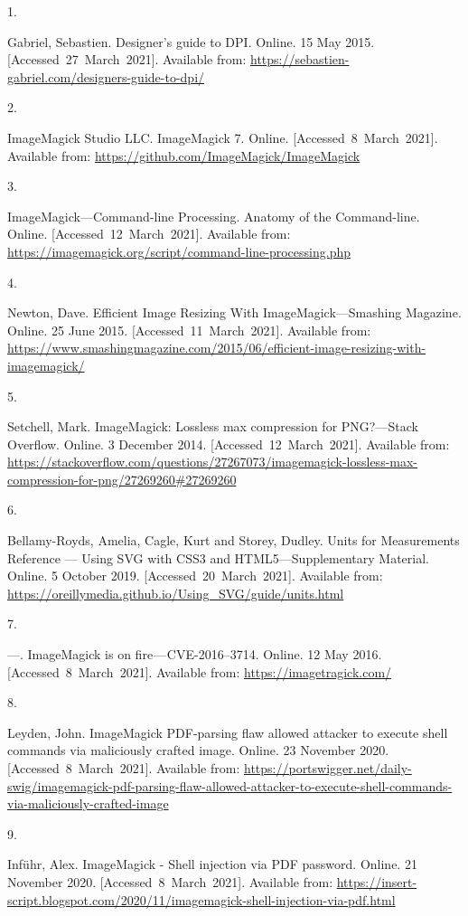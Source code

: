 \documentclass[
  a4paper,
]{article}
\newlength{\cslhangindent}
\newlength{\csllabelwidth}
\newlength{\cslentryspacingunit} %
\newenvironment{CSLReferences}[2] %
 {%
  \setlength{\parindent}{0pt}
  \ifodd #1
  \let\oldpar\par
  \def\par{\hangindent=\cslhangindent\oldpar}
  \fi
  \setlength{\parskip}{#2\cslentryspacingunit}
 }%
 {}
\newcommand{\CSLLeftMargin}[1]{\parbox[t]{\csllabelwidth}{#1}}
\newcommand{\CSLRightInline}[1]{\parbox[t]{\linewidth - \csllabelwidth}{#1}\break}
\begin{document}
\hypertarget{refs}{}
\begin{CSLReferences}{0}{0}
\leavevmode{}%
\CSLLeftMargin{1. }%
\CSLRightInline{Gabriel, Sebastien. {Designer's guide to DPI}. Online.
15 May 2015. {[}Accessed~27~March~2021{]}. Available from:
\url{https://sebastien-gabriel.com/designers-guide-to-dpi/}}

\leavevmode{}%
\CSLLeftMargin{2. }%
\CSLRightInline{ImageMagick Studio LLC. ImageMagick 7. Online.
{[}Accessed~8~March~2021{]}. Available from:
\url{https://github.com/ImageMagick/ImageMagick}}

\leavevmode{}%
\CSLLeftMargin{3. }%
\CSLRightInline{{ImageMagick---Command-line Processing}. {Anatomy of the
Command-line}. Online. {[}Accessed~12~March~2021{]}. Available from:
\url{https://imagemagick.org/script/command-line-processing.php}}

\leavevmode{}%
\CSLLeftMargin{4. }%
\CSLRightInline{Newton, Dave. {Efficient Image Resizing With
ImageMagick---Smashing Magazine}. Online. 25 June 2015.
{[}Accessed~11~March~2021{]}. Available from:
\url{https://www.smashingmagazine.com/2015/06/efficient-image-resizing-with-imagemagick/}}

\leavevmode{}%
\CSLLeftMargin{5. }%
\CSLRightInline{Setchell, Mark. {ImageMagick: Lossless max compression
for PNG?---Stack Overflow}. Online. 3 December 2014.
{[}Accessed~12~March~2021{]}. Available from:
\url{https://stackoverflow.com/questions/27267073/imagemagick-lossless-max-compression-for-png/27269260\#27269260}}

\leavevmode{}%
\CSLLeftMargin{6. }%
\CSLRightInline{Bellamy-Royds, Amelia, Cagle, Kurt and Storey, Dudley.
{Units for Measurements Reference --- Using SVG with CSS3 and
HTML5---Supplementary Material}. Online. 5 October 2019.
{[}Accessed~20~March~2021{]}. Available from:
\url{https://oreillymedia.github.io/Using_SVG/guide/units.html}}

\leavevmode{}%
\CSLLeftMargin{7. }%
\CSLRightInline{---. ImageMagick is on fire --- CVE-2016--3714. Online.
12 May 2016. {[}Accessed~8~March~2021{]}. Available from:
\url{https://imagetragick.com/}}

\leavevmode{}%
\CSLLeftMargin{8. }%
\CSLRightInline{Leyden, John. ImageMagick PDF-parsing flaw allowed
attacker to execute shell commands via maliciously crafted image.
Online. 23 November 2020. {[}Accessed~8~March~2021{]}. Available from:
\url{https://portswigger.net/daily-swig/imagemagick-pdf-parsing-flaw-allowed-attacker-to-execute-shell-commands-via-maliciously-crafted-image}}

\leavevmode{}%
\CSLLeftMargin{9. }%
\CSLRightInline{Inführ, Alex. {ImageMagick - Shell injection via PDF
password}. Online. 21 November 2020. {[}Accessed~8~March~2021{]}.
Available from:
\url{https://insert-script.blogspot.com/2020/11/imagemagick-shell-injection-via-pdf.html}}

\end{CSLReferences}
\end{document}
